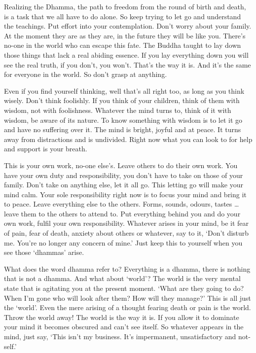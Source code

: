 Realizing the Dhamma, the path to freedom from the round of birth and death, is a task that we all have to do alone. So keep trying to let go and understand the teachings. Put effort into your contemplation. Don't worry about your family. At the moment they are as they are, in the future they will be like you. There's no-one in the world who can escape this fate. The Buddha taught to lay down those things that lack a real abiding essence. If you lay everything down you will see the real truth, if you don't, you won't. That's the way it is. And it's the same for everyone in the world. So don't grasp at anything. 

Even if you find yourself thinking, well that's all right too, as long as you think wisely. Don't think foolishly. If you think of your children, think of them with wisdom, not with foolishness. Whatever the mind turns to, think of it with wisdom, be aware of its nature. To know something with wisdom is to let it go and have no suffering over it. The mind is bright, joyful and at peace. It turns away from distractions and is undivided. Right now what you can look to for help and support is your breath. 

This is your own work, no-one else's. Leave others to do their own work. You have your own duty and responsibility, you don't have to take on those of your family. Don't take on anything else, let it all go. This letting go will make your mind calm. Your sole responsibility right now is to focus your mind and bring it to peace. Leave everything else to the others. Forms, sounds, odours, tastes \ldots{} leave them to the others to attend to. Put everything behind you and do your own work, fulfil your own responsibility. Whatever arises in your mind, be it fear of pain, fear of death, anxiety about others or whatever, say to it, `Don't disturb me. You're no longer any concern of mine.' Just keep this to yourself when you see those `dhammas' arise. 

What does the word dhamma refer to? Everything is a dhamma, there is nothing that is not a dhamma. And what about `world'? The world is the very mental state that is agitating you at the present moment. `What are they going to do? When I'm gone who will look after them? How will they manage?' This is all just the `world'. Even the mere arising of a thought fearing death or pain is the world. Throw the world away! The world is the way it is. If you allow it to dominate your mind it becomes obscured and can't see itself. So whatever appears in the mind, just say, `This isn't my business. It's impermanent, unsatisfactory and not-self.' 

